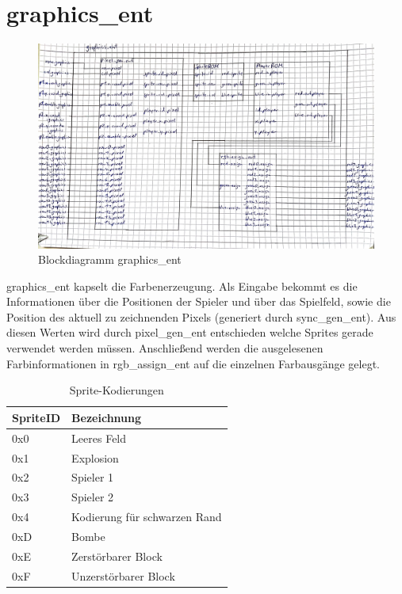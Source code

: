 \documentclass[parskip=full]{scrartcl}
\begin{document}
		\section{graphics\_ent}
			\begin{figure}[H]
				\centering
				\includegraphics[angle=90,scale=0.1]{./bilder/graphics_ent.jpg}
				\caption{Blockdiagramm graphics\_ent}
			\end{figure}
		
			graphics\_ent kapselt die Farbenerzeugung. Als Eingabe bekommt es die Informationen über die Positionen der Spieler und über das Spielfeld, sowie die Position des aktuell zu zeichnenden Pixels (generiert durch sync\_gen\_ent). Aus diesen Werten wird durch pixel\_gen\_ent entschieden welche Sprites gerade verwendet werden müssen. Anschließend werden die ausgelesenen Farbinformationen in rgb\_assign\_ent auf die einzelnen Farbausgänge gelegt.\newline
			
			\begin{table}[H]
				\centering
				\label{spriteCode}
				\begin{tabular}{|l|l|}
					\hline
					\textbf{SpriteID} & \textbf{Bezeichnung}      \\ \hline
					0x0           & Leeres Feld               \\ \hline
					0x1           & Explosion                 \\ \hline
					0x2           & Spieler 1                 \\ \hline
					0x3           & Spieler 2                 \\ \hline
					0x4           & Kodierung für schwarzen Rand \\ \hline
					0xD           & Bombe                     \\ \hline
					0xE           & Zerstörbarer Block        \\ \hline
					0xF           & Unzerstörbarer Block      \\ \hline
				\end{tabular}
				\caption{Sprite-Kodierungen}
			\end{table}
			
\end{document}
